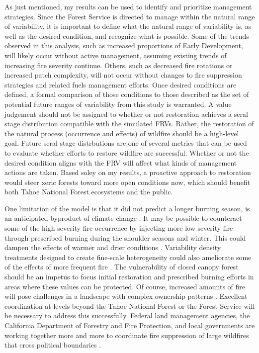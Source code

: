As just mentioned, my results can be used to identify and prioritize management strategies. Since the Forest Service is directed to manage within the natural range of variability, it is important to define what the natural range of variability is, as well as the desired condition, and recognize what is possible. Some of the trends observed in this analysis, such as increased proportions of Early Development, will likely occur without active management, assuming existing trends of increasing fire severity continue. Others, such as decreased fire rotations or increased patch complexity, will not occur without changes to fire suppression strategies and related fuels management efforts. Once desired conditions are defined, a formal comparison of those conditions to those described as the set of potential future ranges of variability from this study is warranted. A value judgement should not be assigned to whether or not restoration achieves a seral stage distribution compatible with the simulated FRVs. Rather, the restoration of the natural process (occurrence and effects) of wildfire should be a high-level goal. Future seral stage distrbutions are one of several metrics that can be used to evaluate whether efforts to restore wildfire are successful. Whether or not the desired condition aligns with the FRV will affect what kinds of management actions are taken. Based soley on my results, a proactive approach to restoration would steer xeric forests toward more open conditions now, which should benefit both Tahoe National Forest ecosystems and the public.

One limitation of the model is that it did not predict a longer burning season, is an anticipated byproduct of climate change \citep{Westerling2008,Stephens2013}. It may be possible to counteract some of the high severity fire occurrence by injecting more low severity fire through prescribed burning during the shoulder seasons and winter. This could dampen the effects of warmer and drier conditions \citep{Conard2003}. Variability density treatments designed to create fine-scale heterogeneity could also ameliorate some of the effects of more frequent fire \citep{Stephens2010,Knapp2012,North2012a}. The vulnerability of closed canopy forest should be an impetus to focus initial restoration and prescribed burning efforts in areas where these values can be protected. Of course, increased amounts of fire will pose challenges in a landscape with complex ownership patterns \citep{Stephens2013}. Excellent coordination at levels beyond the Tahoe National Forest or the Forest Service will be necessary to address this successfully. Federal land management agencies, the California Department of Forestry and Fire Protection, and local governments are working together more and more to coordinate fire suppression of large wildfires that cross political boundaries \citep{InteragencyAgreement2013}.

